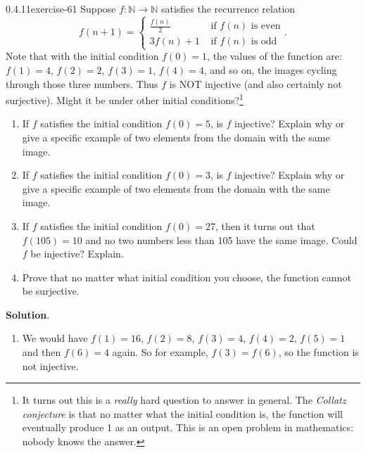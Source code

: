 \documentclass[twoside,11pt,]{book}
\numberwithin{equation}{chapter}
\newcommand{\N}{\mathbb N}
\newcommand{\amp}{&}
\begin{document}
\begin{divisionsolution}{0.4.11}{}{exercise-61}%
\hypertarget{p-1058}{}%
Suppose \(f:\N \to \N\) satisfies the recurrence relation%
\begin{equation*}
f(n+1) = \begin{cases} \frac{f(n)}{2} \amp \text{ if } f(n) \text{ is even} \\ 3f(n) + 1 \amp \text{ if } f(n) \text{ is odd}\end{cases}\text{.}
\end{equation*}
Note that with the initial condition \(f(0) = 1\), the values of the function are: \(f(1) = 4\), \(f(2) = 2\), \(f(3) = 1\), \(f(4) = 4\), and so on, the images cycling through those three numbers. Thus \(f\) is NOT injective (and also certainly not surjective). Might it be under other initial conditions?\footnote{It turns out this is a \emph{really} hard question to answer in general. The \emph{Collatz conjecture} is that no matter what the initial condition is, the function will eventually produce 1 as an output. This is an open problem in mathematics: nobody knows the answer.\label{fn-3}}\leavevmode%
\begin{enumerate}[label=(\alph*)]
\item\hypertarget{li-851}{}\hypertarget{p-1059}{}%
If \(f\) satisfies the initial condition \(f(0) = 5\), is \(f\) injective? Explain why or give a specific example of two elements from the domain with the same image.%
\item\hypertarget{li-852}{}\hypertarget{p-1060}{}%
If \(f\) satisfies the initial condition \(f(0) = 3\), is \(f\) injective? Explain why or give a specific example of two elements from the domain with the same image.%
\item\hypertarget{li-853}{}\hypertarget{p-1061}{}%
If \(f\) satisfies the initial condition \(f(0) = 27\), then it turns out that \(f(105) = 10\) and no two numbers less than 105 have the same image. Could \(f\) be injective? Explain.%
\item\hypertarget{li-854}{}\hypertarget{p-1062}{}%
Prove that no matter what initial condition you choose, the function cannot be surjective.%
\end{enumerate}
%
\par\smallskip%
\noindent\textbf{Solution}.\quad%
\hypertarget{p-1063}{}%
\leavevmode%
\begin{enumerate}[label=(\alph*)]
\item\hypertarget{li-855}{}\hypertarget{p-1064}{}%
We would have \(f(1) = 16\), \(f(2) = 8\), \(f(3) = 4\), \(f(4) = 2\), \(f(5) = 1\) and then \(f(6) = 4\) again. So for example, \(f(3) = f(6)\), so the function is not injective.%

\end{enumerate}
\end{divisionsolution}
\end{document}
